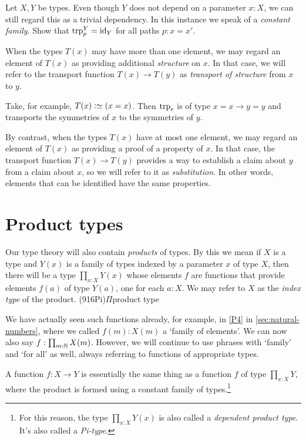 \begin{xca}\label{xca:trp-nondep}
  Let $X,Y$ be types.
  Even though $Y$ does not depend on a parameter $x:X$,
  we can still regard this as a trivial dependency.
  In this instance we speak of a \emph{constant family}.
  Show that $\trp[Y]{p} = \id_Y$ for all paths $p:x=x'$.
\end{xca}
When the types $T(x)$ may have more than one element, 
we may regard an element of $T(x)$ as providing additional \emph{structure} on $x$. 
In that case, we will refer to the transport function $T(x) \to T(y)$ as 
\emph{transport of structure} from $x$ to $y$. 

Take, for example, $T(x)\defeq (x=x)$. 
Then $\trp e$ is of type $x=x \to y=y$ and transports the
symmetries of $x$ to the symmetries of $y$.

By contrast, when the types
$T(x)$ have at most one element, we may regard an element of $T(x)$ 
as providing a proof of a property of $x$. In that case, the transport
function $T(x) \to T(y)$ provides a way to establish a claim about $y$ 
from a claim about $x$, so we will refer to it as \emph{substitution}.  In
other words, elements that can be identified have the same properties.


\section{Product types}
\label{sec:product-types}
Our type theory will also contain \emph{products} of types. 
By this we mean if $X$ is a type and $Y(x)$ is a family of types indexed by a
parameter $x$ of type $X$, then there will be a type $\prod_{x:X} Y(x)$ 
whose elements $f$ are functions that provide elements $f(a)$ of type
$Y(a)$, one for each $a:X$. We may refer to $X$ as the 
\emph{index type} of the product.%
\glossary(916Pi){$\Pi$}{product type}

We have actually seen such functions already, for example,
in \ref{P4} in \cref{sec:natural-numbers}, where
we called $f(m):X(m)$ a `family of elements'. We can now
also say $f: \prod_{m:\mathbb{N}} X(m)$. However, we will continue to use
phrases with `family' and `for all' as well, always referring to functions
of appropriate types.

A function $f : X \to Y$ is essentially the same thing as a function $f$ 
of type $\prod_{x:X} Y$, where the product is formed using a constant family of types.\footnote{%
  For this reason, the type $\prod_{x:X} Y(x)$ is also called a \emph{dependent product type}.
  It's also called a \emph{Pi-type}.}%

